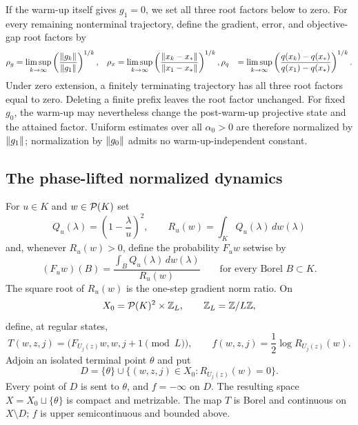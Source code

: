 \documentclass[letterpaper,twoside]{article}
\begin{document}
If the warm-up itself gives $g_1=0$, we set all three root factors below to
zero.  For every remaining nonterminal trajectory, define the gradient,
error, and objective-gap root factors by
\begin{align}
 \rho_g&=\limsup_{k\to\infty}
 \left(\frac{\lVert g_k\rVert}{\lVert g_1\rVert}\right)^{1/k},
 &
 \rho_x&=\limsup_{k\to\infty}
 \left(\frac{\lVert x_k-x_*\rVert}{\lVert x_1-x_*\rVert}\right)^{1/k},
 \label{eq:root-factors}
 \rho_q&=\limsup_{k\to\infty}
 \left(\frac{q(x_k)-q(x_*)}{q(x_1)-q(x_*)}\right)^{1/k}.
\end{align}
Under zero extension, a finitely terminating trajectory has all three root
factors equal to zero.
Deleting a finite prefix leaves the root factor unchanged.  For fixed $g_0$,
the warm-up may nevertheless change the post-warm-up projective state and the
attained factor.  Uniform estimates over all $\alpha_0>0$ are therefore
normalized by $\lVert g_1\rVert$; normalization by $\lVert g_0\rVert$ admits no
warm-up-independent constant.

\subsection{The phase-lifted normalized dynamics}

For $u\in K$ and $w\in\mathcal P(K)$ set
\begin{equation}\label{eq:replicator}
 Q_u(\lambda)=\left(1-\frac\lambda u\right)^2,
 \qquad
 R_u(w)=\int_K Q_u(\lambda)\,dw(\lambda)
\end{equation}
and, whenever $R_u(w)>0$, define the probability $F_u w$ setwise by
\begin{equation}\label{eq:replicator-measure}
 (F_u w)(B)=
 \frac{\int_B Q_u(\lambda)\,dw(\lambda)}{R_u(w)}
 \qquad\text{for every Borel }B\subset K.
\end{equation}
The square root of $R_u(w)$ is the one-step gradient
norm ratio.  On
\[
 X_0=\mathcal P(K)^2\times\mathbb Z_L,
 \qquad \mathbb Z_L=\mathbb Z/L\mathbb Z,
\]
define, at regular states,
\begin{equation}\label{eq:phase-map}
 T(w,z,j)=\bigl(F_{U_j(z)}w,w,j+1\!\!\pmod L\bigr),
 \qquad
 f(w,z,j)=\frac12\log R_{U_j(z)}(w).
\end{equation}
Adjoin an isolated terminal point $\theta$ and put
\[
 D=\{\theta\}\cup
 \{(w,z,j)\in X_0:R_{U_j(z)}(w)=0\}.
\]
Every point of $D$ is sent to $\theta$, and $f=-\infty$ on $D$.  The
resulting space $X=X_0\sqcup\{\theta\}$ is compact and metrizable.  The map
$T$ is Borel and continuous on $X\setminus D$; $f$ is upper semicontinuous
and bounded above.
\end{document}
